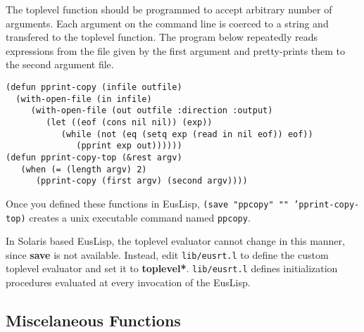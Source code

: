 The toplevel function should be programmed to accept arbitrary number of
arguments.
Each argument on the command line is coerced to a string and transfered
to the toplevel function.
The program below repeatedly reads expressions from the file given by
the first argument and pretty-prints them to the second argument file.

\begin{verbatim}
(defun pprint-copy (infile outfile)
  (with-open-file (in infile)
     (with-open-file (out outfile :direction :output)
        (let ((eof (cons nil nil)) (exp))
           (while (not (eq (setq exp (read in nil eof)) eof))
              (pprint exp out))))))
(defun pprint-copy-top (&rest argv)
   (when (= (length argv) 2)
      (pprint-copy (first argv) (second argv))))
\end{verbatim}

Once you defined these functions in EusLisp, 
{\tt (save "ppcopy" "" 'pprint-copy-top)} creates a unix executable command
named {\tt ppcopy}. 

In Solaris based EusLisp, the toplevel evaluator cannot change in this
manner, since {\bf save} is not available.
Instead, edit {\tt lib/eusrt.l} to define the custom toplevel evaluator
and set it to {\bf *toplevel*}.
{\tt lib/eusrt.l} defines initialization procedures evaluated
at every invocation of the EusLisp.

\subsection{Miscelaneous Functions}

\begin{refdesc}



\end{refdesc}

\newpage


